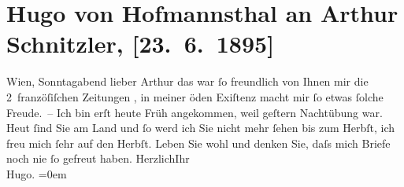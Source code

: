 

               \section[Hugo von Hofmannsthal an Arthur Schnitzler, {[}23. 6. 1895{]}]{ Hugo von Hofmannsthal an Arthur Schnitzler, {[}23. 6. 1895{]}}\nopagebreak{}\rehead{ }\begin{ledgroupsized}[t]{13cm}\normalsize\beginnumbering{} \toendnotes[C]{\smallbreak\pagebreak[2]} 
\toendnotes[C]{\smallbreak}\pstart
           \raggedleft{}{\pb}Wien, Sonntagabend\pend
           \pstart{}lieber Arthur\pend\pstart
           das war ſo freundlich von Ihnen mir die 2 franzöſiſchen Zeitungen \label{K_L00458_1v}\label{K_L00458_1h}, in meiner öden Exiſtenz macht
               mir ſo etwas ſolche Freude. – Ich bin erſt heute Früh angekommen, weil
                  geſtern Nachtübung war. Heut ſind Sie am Land und ſo werd ich Sie
               nicht mehr ſehen bis zum Herbſt, ich freu mich ſehr auf den Herbſt.
               Leben Sie wohl und denken Sie, daſs mich Briefe noch nie ſo gefreut haben.\pend
           \pstart
           Herzlich\hspace*{3.5em}Ihr{\\[\baselineskip]}\spacefill\mbox{Hugo.}\pend
           \leftskip=0em{}          \endnumbering{}\end{ledgroupsized}  \newcommand{\dateiname}{L00458}\newcommand{\titel}{Hugo von Hofmannsthal an Arthur Schnitzler, [23. 6. 1895]}\newcommand{\editorInnen}{Martin Anton Müller und Gerd-Hermann Susen}
            \footnotesize
\begin{ledgroupsized}[t]{11.5cm}
\end{ledgroupsized}
         
      